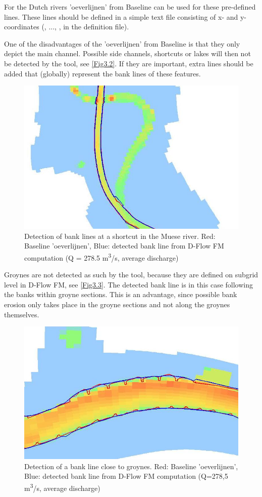 For the Dutch rivers 'oeverlijnen' from Baseline can be used for these pre-defined lines.
These lines should be defined in a simple text file consisting of x- and y- coordinates (, ..., , in the definition file).

One of the disadvantages of the 'oeverlijnen' from Baseline is that they only depict the main channel.
Possible side channels, shortcuts or lakes will then not be detected by the tool, see \autoref{Fig3.2}.
If they are important, extra lines should be added that (globally) represent the bank lines of these features.

\begin{figure}
\includegraphics[width=\textwidth]{figures/Fig3-2.png}
\caption{Detection of bank lines at a shortcut in the Muese river.
Red: Baseline 'oeverlijnen', Blue: detected bank line from D-Flow FM computation (Q = 278.5 m\textsuperscript{3}/s, average discharge)}
\label{Fig3.2}
\end{figure}

Groynes are not detected as such by the tool, because they are defined on subgrid level in D-Flow FM, see \autoref{Fig3.3}.
The detected bank line is in this case following the banks within groyne sections.
This is an advantage, since possible bank erosion only takes place in the groyne sections and not along the groynes themselves.

\begin{figure}
\includegraphics[width=\textwidth]{figures/Fig3-3.png}
\caption{Detection of a bank line close to groynes.
Red: Baseline 'oeverlijnen', Blue: detected bank line from D-Flow FM computation (Q=278,5 m\textsuperscript{3}/s, average discharge)}
\label{Fig3.3}
\end{figure}
